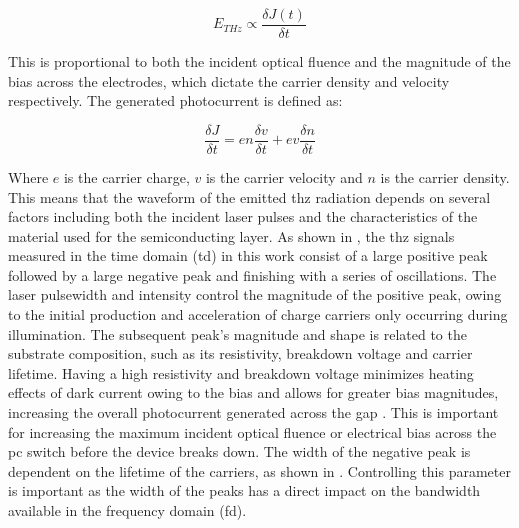 \begin{equation}
E_{THz} \propto{\frac{\delta J(t)}{\delta t}}
\end{equation}

This is proportional to both the incident optical fluence and the magnitude of the bias across the electrodes, which dictate the carrier density and velocity respectively. The generated photocurrent is defined as:

\begin{equation}
\frac{\delta J}{\delta t} = en\frac{\delta v}{\delta t} + ev\frac{\delta n}{\delta t}
\end{equation}

Where \(e\) is the carrier charge, \(v\) is the carrier velocity and \(n\) is the carrier density. This means that the waveform of the emitted \acrshort{thz} radiation depends on several factors including both the incident laser pulses and the characteristics of the material used for the semiconducting layer. As shown in , the \acrshort{thz} signals measured in the time domain (\acrshort{td}) in this work consist of a large positive peak followed by a large negative peak and finishing with a series of oscillations. The laser pulsewidth and intensity control the magnitude of the positive peak, owing to the initial production and acceleration of charge carriers only occurring during illumination. The subsequent peak's magnitude and shape is related to the substrate composition, such as its resistivity, breakdown voltage and carrier lifetime. Having a high resistivity and breakdown voltage minimizes heating effects of dark current owing to the bias and allows for greater bias magnitudes, increasing the overall photocurrent generated across the gap \cite{Warren1991, Tani1997_2}. This is important for increasing the maximum incident optical fluence or electrical bias across the \acrshort{pc} switch before the device breaks down. The width of the negative peak is dependent on the lifetime of the carriers, as shown in . Controlling this parameter is important as the width of the peaks has a direct impact on the bandwidth available in the frequency domain (\acrshort{fd}).


